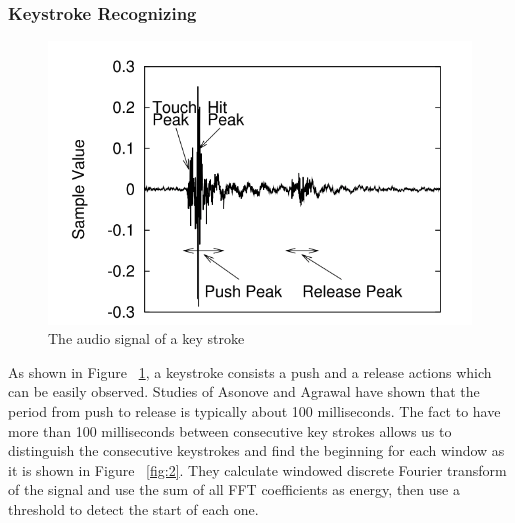 \documentclass[12pt,a4paper]{article}
\begin{document}
\subsubsection*{Keystroke Recognizing}
\begin{figure}[h]
\begin{center}
        \includegraphics[scale=0.45]{audioSignal.png}
        \caption{The audio signal of a key stroke}
        \label{fig:1}
\end{center}
\end{figure} \par
\FloatBarrier

As shown in Figure ~\ref{fig:1}, a keystroke consists a push and a release actions which can be easily observed. Studies of Asonove and Agrawal have shown that the period from push to release is typically about 100 milliseconds\cite{Gould2005}. The fact to have more than 100 milliseconds between consecutive key strokes allows us to distinguish the consecutive keystrokes and find the beginning for each window as it is shown in Figure ~\ref{fig:2}. They calculate windowed discrete Fourier transform of the signal and use the sum of all FFT coefficients as energy, then use a threshold to detect the start of each one.\\
\end{document}
